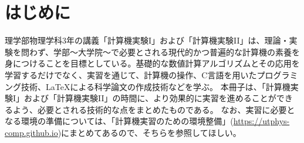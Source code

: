 \section*{はじめに}

\noindent
理学部物理学科3年の講義「計算機実験I」および「計算機実験II」は、理論・実験を問わず、学部〜大学院〜で必要とされる現代的かつ普遍的な計算機の素養を身につけることを目標としている。基礎的な数値計算アルゴリズムとその応用を学習するだけでなく、実習を通じて、計算機の操作、C言語を用いたプログラミング技術、\LaTeX による科学論文の作成技術などを学ぶ。
本冊子は、「計算機実験I」および「計算機実験II」の時間に、より効果的に実習を進めることができるよう、必要とされる技術的な点をまとめたものである。
なお、実習に必要となる環境の準備については、「計算機実習のための環境整備」(\url{https://utphys-comp.github.io})にまとめてあるので、そちらを参照してほしい。

